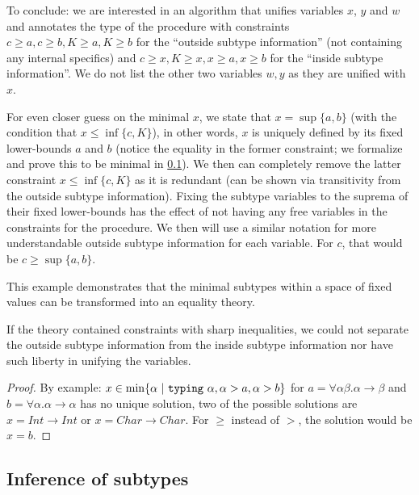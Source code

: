To conclude: we are interested in an algorithm that unifies variables $x$, $y$ and $w$ and annotates the type of the procedure with constraints $c \geq a, c \geq b, K \geq a, K \geq b$ for the ``outside subtype information'' (not containing any internal specifics) and $c \geq x, K \geq x, x \geq a, x \geq b$ for the ``inside subtype information''. We do not list the other two variables $w, y$ as they are unified with $x$.

For even closer guess on the minimal $x$, we state that $x = \sup \{a, b\}$ (with the condition that $x \leq \inf \{c, K\}$), in other words, $x$ is uniquely defined by its fixed lower-bounds $a$ and $b$ (notice the equality in the former constraint; we formalize and prove this to be minimal in \cref{sec:inferSub}). We then can completely remove the latter constraint $x \leq \inf \{c, K\}$ as it is redundant (can be shown via transitivity from the outside subtype information). Fixing the subtype variables to the suprema of their fixed lower-bounds has the effect of not having any free variables in the constraints for the procedure. We then will use a similar notation for more understandable outside subtype information for each variable. For $c$, that would be $c \geq \sup \{a, b\}$.

This example demonstrates that the minimal subtypes within a space of fixed values can be transformed into an equality theory.

\begin{observe}
    If the theory contained constraints with sharp inequalities, we could not separate the outside subtype information from the inside subtype information nor have such liberty in unifying the variables.

    \begin{proof}
        By example: $x \in \min \{ \alpha \ |\  \mathtt{typing}\ \alpha, \alpha > a, \alpha > b \}$ for $a = \forall \alpha \beta . \alpha \to \beta$ and $b = \forall \alpha . \alpha \to \alpha$ has no unique solution, two of the possible solutions are $x = Int \to Int$ or $x = Char \to Char$. For $\geq$ instead of $>$, the solution would be $x = b$.
    \end{proof}
\end{observe}

\subsection{Inference of subtypes}
\label{sec:inferSub}


